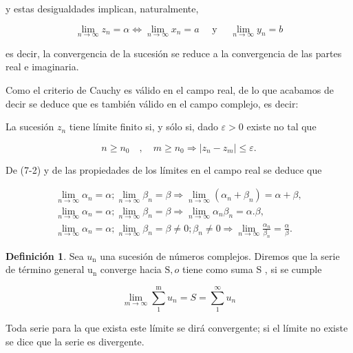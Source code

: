\documentclass[10pt]{article}
\theoremstyle{plain}
\theoremstyle{definition}
\newtheorem{definition}[theorem]{Definición}
\theoremstyle{remark}
\begin{document}
y estas desigualdades implican, naturalmente,

\begin{equation*}
\lim _{n \rightarrow \infty} z_{n}=\alpha \Leftrightarrow \lim _{n \rightarrow \infty} x_{n}=a \quad \text { y } \quad \lim _{n \rightarrow \infty} y_{n}=b \tag{7-2}
\end{equation*}

es decir, la convergencia de la sucesión se reduce a la convergencia de las partes real e imaginaria.

Como el criterio de Cauchy es válido en el campo real, de lo que acabamos de decir se deduce que es también válido en el campo complejo, es decir:

La sucesión $z_{n}$ tiene límite finito si, y sólo si, dado $\varepsilon>0$ existe no tal que


\begin{equation*}
n \geqslant n_{0} \quad, \quad m \geqslant n_{0} \Rightarrow\left|z_{n}-z_{m}\right| \leqslant \varepsilon . \tag{7.3}
\end{equation*}


De (7-2) y de las propiedades de los límites en el campo real se deduce que


\begin{gather*}
\lim _{n \rightarrow \infty} \alpha_{n}=\alpha ; \lim _{n \rightarrow \infty} \beta_{n}=\beta \Rightarrow \lim _{n \rightarrow \infty}\left(\alpha_{n}+\beta_{n}\right)=\alpha+\beta,  \tag{7-4}\\
\lim _{n \rightarrow \infty} \alpha_{n}=\alpha ; \lim _{n \rightarrow \infty} \beta_{n}=\beta \Rightarrow \lim _{n \rightarrow \infty} \alpha_{n} \beta_{n}=\alpha . \beta,  \tag{7-5}\\
\lim _{n \rightarrow \infty} \alpha_{n}=\alpha ; \lim _{n \rightarrow \infty} \beta_{n}=\beta \neq 0 ; \beta_{n} \neq 0 \Rightarrow \lim _{n \rightarrow \infty} \frac{\alpha_{n}}{\beta_{n}}=\frac{\alpha}{\beta} . \tag{7-6}
\end{gather*}


\begin{definition}
Sea $u_{\mathrm{n}}$ una sucesión de números complejos. Diremos que la serie de término general $\mathrm{u}_{\mathrm{n}}$ converge hacia $\mathrm{S}, o$ tiene como suma S , si se cumple

\begin{equation*}
\lim _{m \rightarrow \infty} \sum_{1}^{\mathrm{m}} u_{n}=S=\sum_{1}^{\infty} u_{n} \tag{7-7}
\end{equation*}

Toda serie para la que exista este límite se dirá convergente; si el límite no existe se dice que la serie es divergente.
\end{definition}
\end{document}
